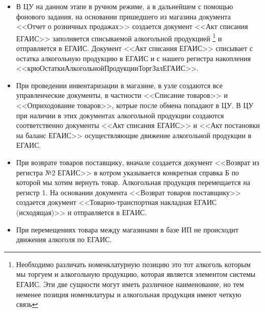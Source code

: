 \begin{itemize}
     \item В ЦУ на данном этапе в ручном режиме, а в дальнейшем с помощью фонового задания, на основании пришедшего из магазина документа <<Отчет о розничных продажах>>  создается документ  <<Акт списания ЕГАИС>> заполняется списываемой алкогольной продукцией \footnote{Необходимо различать номенклатурную позицию это тот алкоголь которым мы торгуем и алкогольную продукцию, которая является элементом системы ЕГАИС. Эти две сущности могут иметь различное наименование, но тем неменее позиция номенклатуры и алкогольная продукция имеют четкую связь} и отправляется в ЕГАИС. Документ <<Акт списания ЕГАИС>> списывает с остатка алкогольную продукцию в ЕГАИС и с нашего регистра накопления <<крюОстаткиАлкогольнойПродукцииТоргЗалЕГАИС>>.
     \item При проведении инвентаризации в магазине, в узле создаются все управленческие документы, в частности <<Списание товаров>> и <<Оприходование товаров>>, котрые после обмена попадают в ЦУ. В ЦУ при наличии в этих документах алкогольной продукции создаются соответственно документы <<Акт списания ЕГАИС>> и <<Акт постановки на баланс ЕГАИС>> осуществляющие движение алкогольной продукции в ЕГАИС.
     \item При возврате товаров поставщику,  вначале создается документ <<Возврат из регистра №2 ЕГАИС>>  в котром указывается конкретная справка Б по которой мы хотим вернуть товар. Алкогольная продукция перемещается на регистр 1. На основании документа <<Возврат товаров поставщику>> создается документ <<Товарно-транспортная накладная ЕГАИС (исходящая)>> и отправляется в ЕГАИС.
      \item При перемещениях товара между магазинами в базе ИП не происходит движения алкоголя по ЕГАИС.

 \end{itemize}
